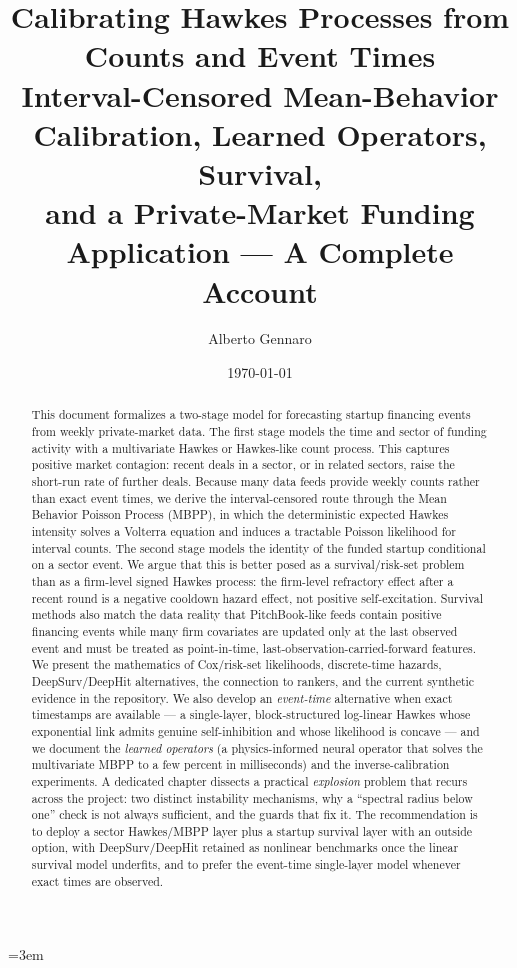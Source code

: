 \documentclass[11pt]{article}
\title{\bfseries Calibrating Hawkes Processes from Counts and Event Times\\[3pt]
\large Interval-Censored Mean-Behavior Calibration, Learned Operators, Survival,\\
and a Private-Market Funding Application --- A Complete Account}
\author{Alberto Gennaro}
\date{\today}
\theoremstyle{plain}
\theoremstyle{definition}
\theoremstyle{remark}
\begin{document}
\emergencystretch=3em
\maketitle

\begin{abstract}
This document formalizes a two-stage model for forecasting startup financing events from weekly private-market data. The first stage models the time and sector of funding activity with a multivariate Hawkes or Hawkes-like count process. This captures positive market contagion: recent deals in a sector, or in related sectors, raise the short-run rate of further deals. Because many data feeds provide weekly counts rather than exact event times, we derive the interval-censored route through the Mean Behavior Poisson Process (MBPP), in which the deterministic expected Hawkes intensity solves a Volterra equation and induces a tractable Poisson likelihood for interval counts. The second stage models the identity of the funded startup conditional on a sector event. We argue that this is better posed as a survival/risk-set problem than as a firm-level signed Hawkes process: the firm-level refractory effect after a recent round is a negative cooldown hazard effect, not positive self-excitation. Survival methods also match the data reality that PitchBook-like feeds contain positive financing events while many firm covariates are updated only at the last observed event and must be treated as point-in-time, last-observation-carried-forward features. We present the mathematics of Cox/risk-set likelihoods, discrete-time hazards, DeepSurv/DeepHit alternatives, the connection to rankers, and the current synthetic evidence in the repository. We also develop an \emph{event-time} alternative when exact timestamps are available --- a single-layer, block-structured log-linear Hawkes whose exponential link admits genuine self-inhibition and whose likelihood is concave --- and we document the \emph{learned operators} (a physics-informed neural operator that solves the multivariate MBPP to a few percent in milliseconds) and the inverse-calibration experiments. A dedicated chapter dissects a practical \emph{explosion} problem that recurs across the project: two distinct instability mechanisms, why a ``spectral radius below one'' check is not always sufficient, and the guards that fix it. The recommendation is to deploy a sector Hawkes/MBPP layer plus a startup survival layer with an outside option, with DeepSurv/DeepHit retained as nonlinear benchmarks once the linear survival model underfits, and to prefer the event-time single-layer model whenever exact times are observed.
\end{abstract}
\end{document}
